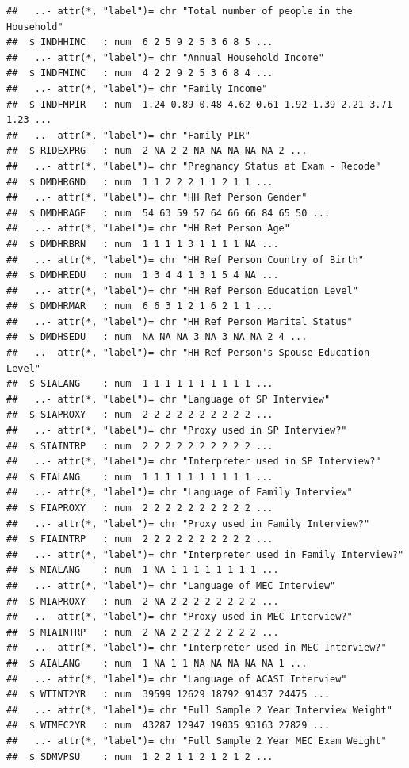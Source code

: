 \documentclass[
]{book}
\theoremstyle{definition}
\theoremstyle{definition}
\theoremstyle{definition}
\theoremstyle{remark}
\begin{document}
\begin{verbatim}
##   ..- attr(*, "label")= chr "Total number of people in the Household"
##  $ INDHHINC   : num  6 2 5 9 2 5 3 6 8 5 ...
##   ..- attr(*, "label")= chr "Annual Household Income"
##  $ INDFMINC   : num  4 2 2 9 2 5 3 6 8 4 ...
##   ..- attr(*, "label")= chr "Family Income"
##  $ INDFMPIR   : num  1.24 0.89 0.48 4.62 0.61 1.92 1.39 2.21 3.71 1.23 ...
##   ..- attr(*, "label")= chr "Family PIR"
##  $ RIDEXPRG   : num  2 NA 2 2 NA NA NA NA NA 2 ...
##   ..- attr(*, "label")= chr "Pregnancy Status at Exam - Recode"
##  $ DMDHRGND   : num  1 1 2 2 2 1 1 2 1 1 ...
##   ..- attr(*, "label")= chr "HH Ref Person Gender"
##  $ DMDHRAGE   : num  54 63 59 57 64 66 66 84 65 50 ...
##   ..- attr(*, "label")= chr "HH Ref Person Age"
##  $ DMDHRBRN   : num  1 1 1 1 3 1 1 1 1 NA ...
##   ..- attr(*, "label")= chr "HH Ref Person Country of Birth"
##  $ DMDHREDU   : num  1 3 4 4 1 3 1 5 4 NA ...
##   ..- attr(*, "label")= chr "HH Ref Person Education Level"
##  $ DMDHRMAR   : num  6 6 3 1 2 1 6 2 1 1 ...
##   ..- attr(*, "label")= chr "HH Ref Person Marital Status"
##  $ DMDHSEDU   : num  NA NA NA 3 NA 3 NA NA 2 4 ...
##   ..- attr(*, "label")= chr "HH Ref Person's Spouse Education Level"
##  $ SIALANG    : num  1 1 1 1 1 1 1 1 1 1 ...
##   ..- attr(*, "label")= chr "Language of SP Interview"
##  $ SIAPROXY   : num  2 2 2 2 2 2 2 2 2 2 ...
##   ..- attr(*, "label")= chr "Proxy used in SP Interview?"
##  $ SIAINTRP   : num  2 2 2 2 2 2 2 2 2 2 ...
##   ..- attr(*, "label")= chr "Interpreter used in SP Interview?"
##  $ FIALANG    : num  1 1 1 1 1 1 1 1 1 1 ...
##   ..- attr(*, "label")= chr "Language of Family Interview"
##  $ FIAPROXY   : num  2 2 2 2 2 2 2 2 2 2 ...
##   ..- attr(*, "label")= chr "Proxy used in Family Interview?"
##  $ FIAINTRP   : num  2 2 2 2 2 2 2 2 2 2 ...
##   ..- attr(*, "label")= chr "Interpreter used in Family Interview?"
##  $ MIALANG    : num  1 NA 1 1 1 1 1 1 1 1 ...
##   ..- attr(*, "label")= chr "Language of MEC Interview"
##  $ MIAPROXY   : num  2 NA 2 2 2 2 2 2 2 2 ...
##   ..- attr(*, "label")= chr "Proxy used in MEC Interview?"
##  $ MIAINTRP   : num  2 NA 2 2 2 2 2 2 2 2 ...
##   ..- attr(*, "label")= chr "Interpreter used in MEC Interview?"
##  $ AIALANG    : num  1 NA 1 1 NA NA NA NA NA 1 ...
##   ..- attr(*, "label")= chr "Language of ACASI Interview"
##  $ WTINT2YR   : num  39599 12629 18792 91437 24475 ...
##   ..- attr(*, "label")= chr "Full Sample 2 Year Interview Weight"
##  $ WTMEC2YR   : num  43287 12947 19035 93163 27829 ...
##   ..- attr(*, "label")= chr "Full Sample 2 Year MEC Exam Weight"
##  $ SDMVPSU    : num  1 2 2 1 1 2 1 2 1 2 ...

\end{verbatim}
\end{document}
